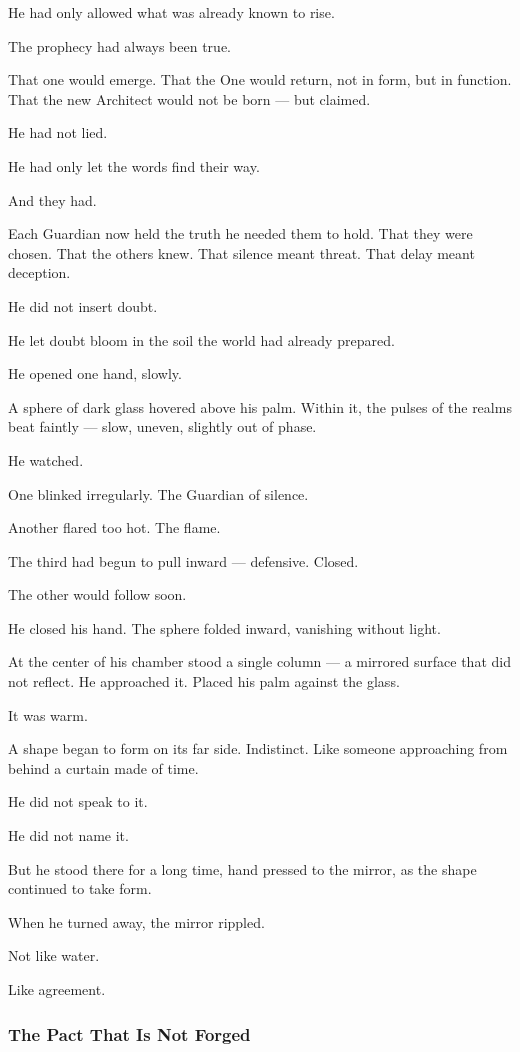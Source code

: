 \documentclass[12pt]{article}
\begin{document}
He had only allowed what was already known to rise.

The prophecy had always been true.

That one would emerge. That the One would return, not in form, but in function. That the new Architect would not be born — but claimed.

He had not lied.

He had only let the words find their way.

And they had.

Each Guardian now held the truth he needed them to hold. That they were chosen. That the others knew. That silence meant threat. That delay meant deception.

He did not insert doubt.

He let doubt bloom in the soil the world had already prepared.

He opened one hand, slowly.

A sphere of dark glass hovered above his palm. Within it, the pulses of the realms beat faintly — slow, uneven, slightly out of phase.

He watched.

One blinked irregularly. The Guardian of silence.

Another flared too hot. The flame.

The third had begun to pull inward — defensive. Closed.

The other would follow soon.

He closed his hand. The sphere folded inward, vanishing without light.

At the center of his chamber stood a single column — a mirrored surface that did not reflect. He approached it. Placed his palm against the glass.

It was warm.

A shape began to form on its far side. Indistinct. Like someone approaching from behind a curtain made of time.

He did not speak to it.

He did not name it.

But he stood there for a long time, hand pressed to the mirror, as the shape continued to take form.

When he turned away, the mirror rippled.

Not like water.

Like agreement.

\dotfill

\subsubsection*{The Pact That Is Not Forged}
\end{document}
